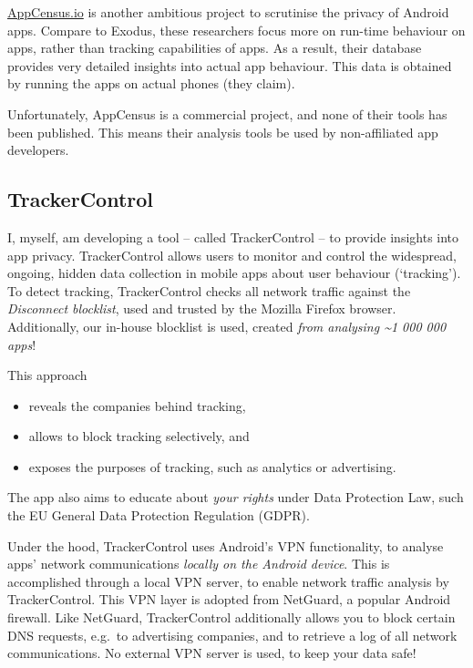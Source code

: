 \documentclass[
]{book}
\providecommand{\tightlist}{%
  \setlength{\itemsep}{0pt}\setlength{\parskip}{0pt}}
\begin{document}
\href{https://search.appcensus.io/}{AppCensus.io} is another ambitious project to scrutinise the privacy of Android apps. Compare to Exodus, these researchers focus more on run-time behaviour on apps, rather than tracking capabilities of apps. As a result, their database provides very detailed insights into actual app behaviour. This data is obtained by running the apps on actual phones (they claim).

Unfortunately, AppCensus is a commercial project, and none of their tools has been published. This means their analysis tools be used by non-affiliated app developers.

\hypertarget{trackercontrol}{%
\subsection{TrackerControl}\label{trackercontrol}}

I, myself, am developing a tool -- called TrackerControl -- to provide insights into app privacy. TrackerControl allows users to monitor and control the widespread, ongoing, hidden data collection in mobile apps about user behaviour (`tracking'). To detect tracking, TrackerControl checks all network traffic against the \emph{Disconnect blocklist}, used and trusted by the Mozilla Firefox browser. Additionally, our in-house blocklist is used, created \emph{from analysing \textasciitilde1 000 000 apps}!

This approach

\begin{itemize}
\tightlist
\item
  reveals the companies behind tracking,
\item
  allows to block tracking selectively, and
\item
  exposes the purposes of tracking, such as analytics or advertising.
\end{itemize}

The app also aims to educate about \emph{your rights} under Data Protection Law, such the EU General Data Protection Regulation (GDPR).

Under the hood, TrackerControl uses Android's VPN functionality, to analyse apps' network communications \emph{locally on the Android device}. This is accomplished through a local VPN server, to enable network traffic analysis by TrackerControl. This VPN layer is adopted from NetGuard, a popular Android firewall. Like NetGuard, TrackerControl additionally allows you to block certain DNS requests, e.g.~to advertising companies, and to retrieve a log of all network communications. No external VPN server is used, to keep your data safe!
\end{document}
